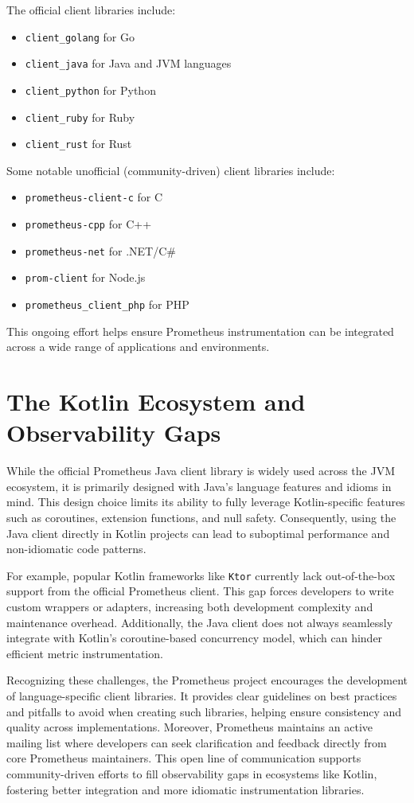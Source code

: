 The official client libraries include:
\begin{itemize}
    \item \texttt{client\_golang} for Go
    \item \texttt{client\_java} for Java and \ac{JVM} languages
    \item \texttt{client\_python} for Python
    \item \texttt{client\_ruby} for Ruby
    \item \texttt{client\_rust} for Rust
\end{itemize}

Some notable unofficial (community-driven) client libraries include:
\begin{itemize}
    \item \texttt{prometheus-client-c} for C
    \item \texttt{prometheus-cpp} for C++
    \item \texttt{prometheus-net} for .NET/C\#
    \item \texttt{prom-client} for Node.js
    \item \texttt{prometheus\_client\_php} for PHP
\end{itemize}

This ongoing effort helps ensure Prometheus instrumentation can be integrated across a wide range of applications and environments.

\section{The Kotlin Ecosystem and Observability Gaps}\label{sec:the-kotlin-ecosystem-and-observability-gaps}

While the official Prometheus Java client library is widely used across the \ac{JVM} ecosystem, it is primarily
designed with Java’s language features and idioms in mind.
This design choice limits its ability to fully leverage Kotlin-specific features such as coroutines, extension functions, and null safety.
Consequently, using the Java client directly in Kotlin projects can lead to suboptimal performance and non-idiomatic code patterns.

For example, popular Kotlin frameworks like \texttt{Ktor} currently lack out-of-the-box support from the official Prometheus client.
This gap forces developers to write custom wrappers or adapters, increasing both development complexity and maintenance overhead.
Additionally, the Java client does not always seamlessly integrate with Kotlin’s coroutine-based concurrency model, which can hinder efficient metric instrumentation.

Recognizing these challenges, the Prometheus project encourages the development of language-specific client libraries.
It provides clear guidelines on best practices and pitfalls to avoid when creating such libraries, helping ensure consistency and quality across implementations.
Moreover, Prometheus maintains an active mailing list where developers can seek clarification and feedback directly from core Prometheus maintainers.
This open line of communication supports community-driven efforts to fill observability gaps in ecosystems like Kotlin, fostering better integration and more idiomatic instrumentation libraries.
